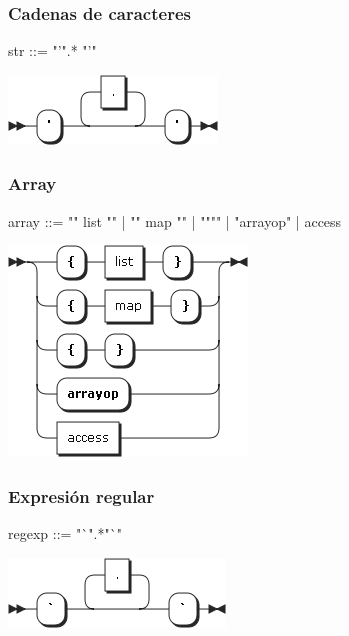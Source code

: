 \subsubsection{Cadenas de caracteres}
\begin{multicols}{2}
\begin{myverbatim}      
str ::= "'".* "'"
\end{myverbatim}  
\columnbreak	
\begin{center}
\includegraphics[scale=0.4]{diagram/str.png} \\
\end{center}
\end{multicols}

\subsubsection{Array}
\begin{multicols}{2}
\begin{myverbatim}      
array ::=   "{" list "}"
         |  "{" map "}"
         |  "{""}"
         |  "arrayop"
         |  access
\end{myverbatim}  
\columnbreak	
\begin{center}
\includegraphics[scale=0.4]{diagram/array.png} \\
\end{center}
\end{multicols}

\subsubsection{Expresión regular}
\begin{multicols}{2}
\begin{myverbatim}      
regexp ::= "`".*"`" 
\end{myverbatim}  
\columnbreak	
\begin{center}
\includegraphics[scale=0.4]{diagram/regexp.png} \\
\end{center}
\end{multicols}

